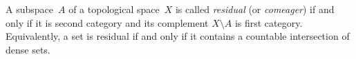 \documentclass[12pt]{article}
\begin{document}
A subspace~$A$ of a topological space~$X$ is called {\em residual} (or {\em comeager}) if and only if it is second category and its complement $X\setminus A$ is first category.  Equivalently, a set is residual if and only if it contains a countable intersection of  dense sets.
\end{document}
